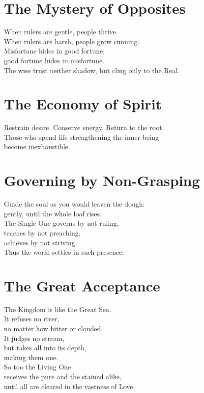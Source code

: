 \documentclass[10pt, openright]{book}
\begin{document}
\section{The Mystery of Opposites}
When rulers are gentle, people thrive. \\
When rulers are harsh, people grow cunning. \\

Misfortune hides in good fortune; \\
good fortune hides in misfortune. \\
The wise trust neither shadow, but cling only to the Real.

\section{The Economy of Spirit}
Restrain desire. Conserve energy. Return to the root. \\
Those who spend life strengthening the inner being \\
become inexhaustible.

\section{Governing by Non-Grasping}
Guide the soul as you would leaven the dough: \\
gently, until the whole loaf rises. \\
The Single One governs by not ruling, \\
teaches by not preaching, \\
achieves by not striving. \\
Thus the world settles in such presence.

\section{The Great Acceptance}
The Kingdom is like the Great Sea. \\
It refuses no river, \\
no matter how bitter or clouded. \\
It judges no stream, \\
but takes all into its depth, \\
making them one. \\

So too the Living One \\
receives the pure and the stained alike, \\
until all are cleared in the vastness of Love.
\end{document}
